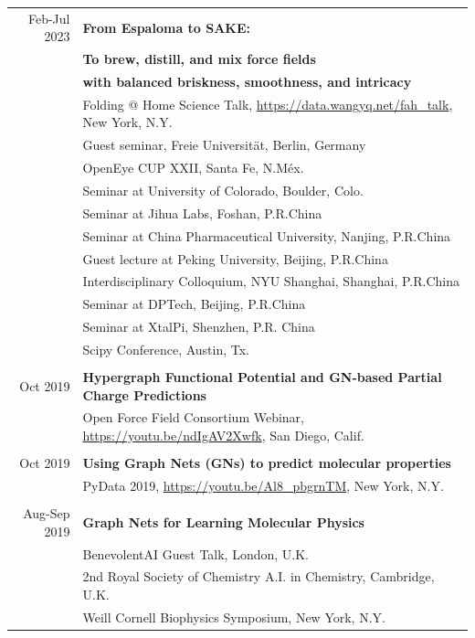 \begin{tabular}{rl}
Feb-Jul 2023 & \textbf{From Espaloma to SAKE: }\\
& \textbf{To brew, distill, and mix force fields} \\
& \textbf{with balanced briskness, smoothness, and intricacy}\\
& Folding @ Home Science Talk, \url{https://data.wangyq.net/fah_talk}, New York, N.Y. \\
& Guest seminar, Freie Universität, Berlin, Germany \\
& OpenEye CUP XXII, Santa Fe, N.Méx.\\
& Seminar at University of Colorado, Boulder, Colo.\\
& Seminar at Jihua Labs, Foshan, P.R.China\\
& Seminar at China Pharmaceutical University, Nanjing, P.R.China\\
& Guest lecture at Peking University, Beijing, P.R.China \\
& Interdisciplinary Colloquium, NYU Shanghai, Shanghai, P.R.China\\
& Seminar at DPTech, Beijing, P.R.China\\
& Seminar at XtalPi, Shenzhen, P.R. China\\
& Scipy Conference, Austin, Tx.\\\\

Oct 2019 & \textbf{Hypergraph Functional Potential and GN-based Partial Charge Predictions}\\
    & Open Force Field Consortium Webinar, \url{https://youtu.be/ndIgAV2Xwfk}, San Diego, Calif.\\\\

Oct 2019 & \textbf{Using Graph Nets (GNs) to predict molecular properties}\\
         & PyData 2019, \url{https://youtu.be/Al8_pbgrnTM}, New York, N.Y.\\\\

Aug-Sep 2019 & \textbf{Graph Nets for Learning Molecular Physics} \\
         & BenevolentAI Guest Talk, London, U.K.\\
         & 2nd Royal Society of Chemistry A.I. in Chemistry, Cambridge, U.K.\\
         & Weill Cornell Biophysics Symposium, New York, N.Y.\\

\end{tabular}



